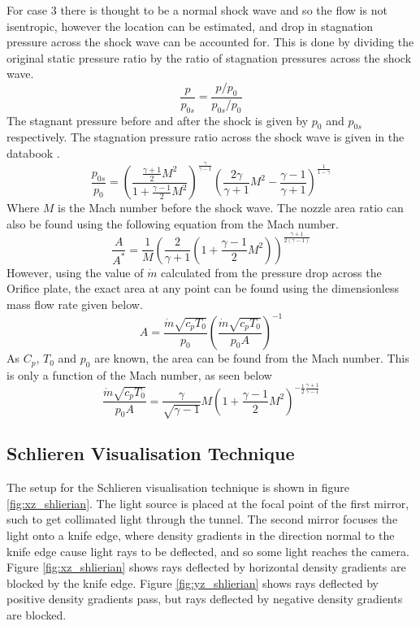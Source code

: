 \documentclass{article}
\begin{document}
For case 3 there is thought to be a normal shock wave and so the flow is not isentropic, however the location can be estimated, and drop in stagnation pressure across the shock wave can be accounted for.
This is done by dividing the original static pressure ratio by the ratio of stagnation pressures across the shock wave.
\begin{equation}
    \frac{p}{p_{0s}} = \frac{p/p_0}{p_{0s}/p_0}
\end{equation}
The stagnant pressure before and after the shock is given by $p_0$ and $p_{0s}$ respectively.
The stagnation pressure ratio across the shock wave is given in the databook \cite{data_book}.
\begin{equation}
    \frac{p_{0s}}{p_0} = \left( \frac{\frac{\gamma+1}{2}M^2}{1 + \frac{\gamma-1}{2}M^2}\right) ^ \frac{\gamma}{\gamma-1} \left( \frac{2\gamma}{\gamma+1} M^2 - \frac{\gamma-1}{\gamma+1}\right) ^ \frac{1}{1 - \gamma}
\end{equation}
Where $M$ is the Mach number before the shock wave.
The nozzle area ratio can also be found using the following equation from the Mach number.
\begin{equation}
    \frac{A}{A^*} = \frac{1}{M} \left( \frac{2}{\gamma+1} \left( 1 + \frac{\gamma-1}{2}M^2\right) \right) ^ {\frac{\gamma+1}{2(\gamma-1)}}
\end{equation}
However, using the value of $\dot{m}$ calculated from the pressure drop across the Orifice plate, the exact area at any point can be found using the dimensionless mass flow rate given below.
\begin{equation}
    A = \frac{\dot{m}\sqrt{c_pT_0}}{p_0} \left( \frac{\dot{m}\sqrt{c_pT_0}}{p_0A} \right)^{-1}
    \label{eqn:area}
\end{equation}
As $C_p$, $T_0$ and $p_0$ are known, the area can be found from the Mach number.
This is only a function of the Mach number, as seen below
\begin{equation}
    \frac{\dot{m}\sqrt{c_pT_0}}{p_0A} = \frac{\gamma}{\sqrt{\gamma-1}} M \left(1 + \frac{\gamma - 1}{2} M^2 \right) ^ {- \frac{1}{2}\frac{\gamma + 1}{\gamma - 1}} 
\end{equation}

\subsection{Schlieren Visualisation Technique}

The setup for the Schlieren visualisation technique is shown in figure \ref{fig:xz_shlierian}.
The light source is placed at the focal point of the first mirror, such to get collimated light through the tunnel.
The second mirror focuses the light onto a knife edge, where density gradients in the direction normal to the knife edge cause light rays to be deflected, and so some light reaches the camera.
Figure \ref{fig:xz_shlierian} shows rays deflected by horizontal density gradients are blocked by the knife edge.
Figure \ref{fig:yz_shlierian} shows rays deflected by positive density gradients pass, but rays deflected by negative density gradients are blocked.
\end{document}
